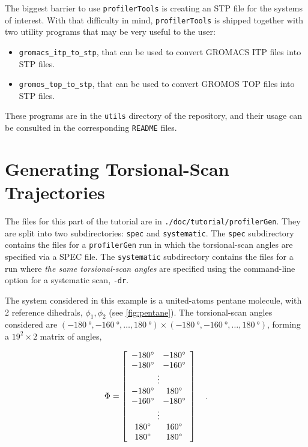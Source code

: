 \documentclass[10pt,a4paper,openany]{memoir}
\numberwithin{equation}{section}
\newcommand{\profilergen}[0]{\texttt{profilerGen}}
\newcommand{\profilertools}[0]{\texttt{profilerTools}}
\begin{document}
The biggest barrier to use \profilertools{} is creating an STP file
for the systems of interest.  With that difficulty in mind,
\profilertools{} is shipped together with two utility programs that
may be very useful to the user:
\begin{itemize}
\item \texttt{gromacs\_itp\_to\_stp}, that can be used to convert GROMACS
  ITP files into STP files.
\item \texttt{gromos\_top\_to\_stp}, that can be used to convert GROMOS
  TOP files into STP files.
\end{itemize}
These programs are in the \texttt{utils} directory of the repository,
and their usage can be consulted in the corresponding \texttt{README}
files.

\section{Generating Torsional-Scan Trajectories}
\label{sec:tutorial-profilergen}

The files for this part of the tutorial are in
\texttt{./doc/tutorial/profilerGen}. They are split into two
subdirectories: \texttt{spec} and \texttt{systematic}.  The
\texttt{spec} subdirectory contains the files for a \profilergen{} run
in which the torsional-scan angles are specified via a SPEC file.  The
\texttt{systematic} subdirectory contains the files for a run where
\textit{the same torsional-scan angles} are specified using the
command-line option for a systematic scan, \texttt{-dr}.

The system considered in this example is a united-atoms pentane
molecule, with 2 reference dihedrals, $\phi_1,\phi_2$ (see
\autoref{fig:pentane}). The torsional-scan angles considered are
$(\SI{-180}{\degree},\SI{-160}{\degree},\ldots,\SI{180}{\degree})
\times
(\SI{-180}{\degree},\SI{-160}{\degree},\ldots,\SI{180}{\degree})$,
forming a $19^2 \times 2$ matrix of angles,

\begin{align}\label{eq:tutorial-gen-matrix}
  \Phi = \left[
  \begin{array}{cc}
    \SI{-180}{\degree}&\SI{-180}{\degree} \\
    \SI{-180}{\degree}&\SI{-160}{\degree} \\
    \multicolumn{2}{c}{\vdots} \\
    \SI{-180}{\degree}&\SI{+180}{\degree} \\
    \SI{-160}{\degree}&\SI{-180}{\degree} \\
    \multicolumn{2}{c}{\vdots} \\
    \SI{+180}{\degree}&\SI{+160}{\degree} \\
    \SI{+180}{\degree}&\SI{+180}{\degree} \\
  \end{array}
  \right] \quad .
\end{align}
\end{document}
